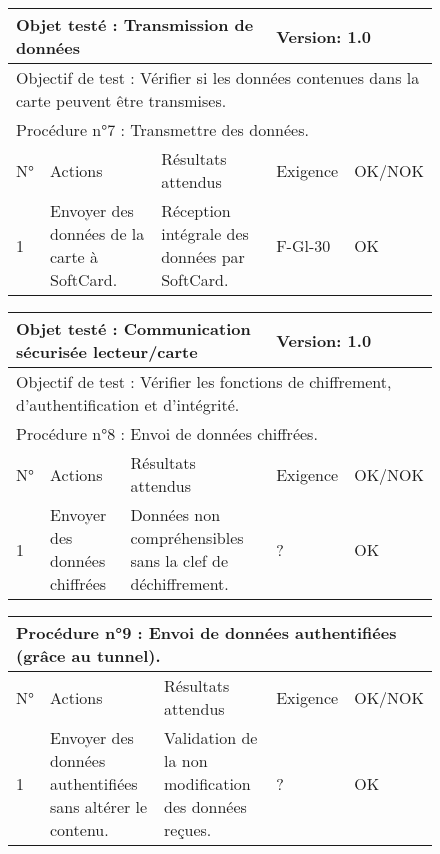 \documentclass[a4paper,11pt,french]{article}
\begin{document}
\begin{figure}[!h]
\begin{tabular}{|p{1cm}|p{5cm}|p{5cm}|p{2cm}|p{2cm}|}
\hline
\multicolumn{3}{|l|}{Objet testé : Transmission de données} & \multicolumn{2}{|l|}{Version: 1.0} \\
\hline
\multicolumn{5}{|l|}{Objectif de test : Vérifier si les données contenues dans la carte peuvent être transmises.} \\
\hline
\multicolumn{5}{|l|}{Procédure n°7 : Transmettre des données.} \\
\hline
N° & Actions & Résultats attendus & Exigence & OK/NOK \\
\hline
1 & Envoyer des données de la carte à SoftCard. & Réception intégrale des données par SoftCard. & F-Gl-30 & OK \\
\hline
\end{tabular}
\end{figure}


\begin{figure}[!h]
\begin{tabular}{|p{1cm}|p{5cm}|p{5cm}|p{2cm}|p{2cm}|}
\hline
\multicolumn{3}{|l|}{Objet testé : Communication sécurisée lecteur/carte} & \multicolumn{2}{|l|}{Version: 1.0} \\
\hline
\multicolumn{5}{|l|}{Objectif de test : Vérifier les fonctions de chiffrement, d'authentification et d'intégrité.} \\
\hline
\multicolumn{5}{|l|}{Procédure n°8 : Envoi de données chiffrées.} \\
\hline
N° & Actions & Résultats attendus & Exigence & OK/NOK \\
\hline
1 & Envoyer des données chiffrées & Données non compréhensibles sans la clef de déchiffrement. & ? & OK \\
\hline
\end{tabular}
\end{figure}



\begin{figure}[!h]
\begin{tabular}{|p{1cm}|p{5cm}|p{5cm}|p{2cm}|p{2cm}|}
\hline
\multicolumn{5}{|l|}{Procédure n°9 : Envoi de données authentifiées (grâce au tunnel).} \\
\hline
N° & Actions & Résultats attendus & Exigence & OK/NOK \\
\hline
1 & Envoyer des données authentifiées sans altérer le contenu. & Validation de la non modification des données reçues. & ? & OK \\
\hline
\end{tabular}
\end{figure}
\end{document}

